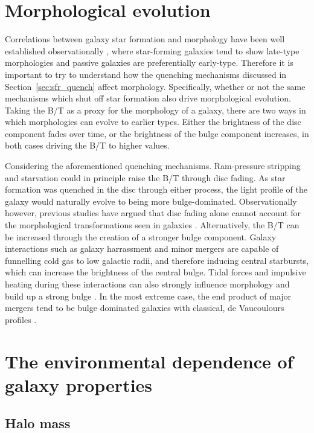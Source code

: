 \section{Morphological evolution}
\label{sec:morph_evolution}

Correlations between galaxy star formation and morphology have been
well established observationally \citep[e.g.][]{schawinski2014}, where
star-forming
galaxies tend to show late-type morphologies and passive galaxies are
preferentially early-type.  Therefore it is important to try to
understand how the quenching mechanisms discussed in
Section~\ref{sec:sfr_quench} affect morphology.  Specifically, whether or not the same
mechanisms which shut off star formation also drive morphological
evolution.  Taking the B/T as a proxy for the morphology of a galaxy,
there are two ways in which morphologies can evolve to earlier types.
Either the brightness of the disc component fades over time, or the brightness
of the bulge component increases, in both cases driving the B/T to
higher values.
\par
Considering the aforementioned quenching mechanisms.  Ram-pressure
stripping and starvation could in principle raise the B/T through disc
fading.  As star formation was quenched in the disc through either
process, the light profile of the galaxy would naturally evolve to
being more bulge-dominated.  Observationally however, previous studies
have argued that disc fading alone cannot account for the
morphological transformations seen in galaxies \citep{christlein2004,
  bundy2010}.  Alternatively, the B/T can be increased through the
creation of a stronger bulge component.  Galaxy interactions such as galaxy
harrassment and minor mergers are capable of funnelling cold gas to
low galactic radii, and therefore inducing central starbursts, which
can increase the brightness of the
central bulge.  Tidal forces and impulsive heating during these interactions can also
strongly influence morphology and build up a strong bulge
\citep{moore1996, bekki2011}.  In the most extreme
case, the end product
of major mergers tend to be bulge dominated galaxies with classical,
de Vaucoulours profiles \citep[e.g.][]{barnes1989}.

\section{The environmental dependence of galaxy properties}
\label{sec:enviro_dependence}

\subsection{Halo mass}
\label{sec:halo_mass}


